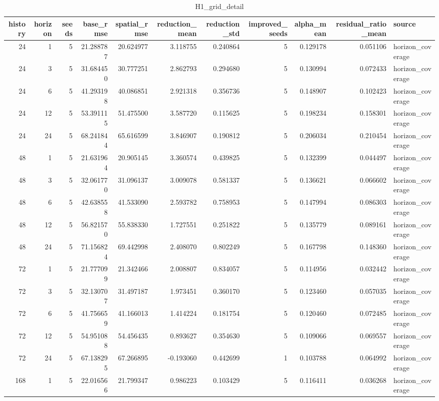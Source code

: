 \begin{table}
\caption{H1_grid_detail}
\label{tab:H1_grid_detail}
\begin{tabular}{rrrrrrrrrrl}
\toprule
history & horizon & seeds & base\_rmse & spatial\_rmse & reduction\_mean & reduction\_std & improved\_seeds & alpha\_mean & residual\_ratio\_mean & source \\
\midrule
24 & 1 & 5 & 21.288787 & 20.624977 & 3.118755 & 0.240864 & 5 & 0.129178 & 0.051106 & horizon\_coverage \\
24 & 3 & 5 & 31.684450 & 30.777251 & 2.862793 & 0.294680 & 5 & 0.130994 & 0.072433 & horizon\_coverage \\
24 & 6 & 5 & 41.293198 & 40.086851 & 2.921318 & 0.356736 & 5 & 0.148907 & 0.102423 & horizon\_coverage \\
24 & 12 & 5 & 53.391115 & 51.475500 & 3.587720 & 0.115625 & 5 & 0.198234 & 0.158301 & horizon\_coverage \\
24 & 24 & 5 & 68.241844 & 65.616599 & 3.846907 & 0.190812 & 5 & 0.206034 & 0.210454 & horizon\_coverage \\
48 & 1 & 5 & 21.631964 & 20.905145 & 3.360574 & 0.439825 & 5 & 0.132399 & 0.044497 & horizon\_coverage \\
48 & 3 & 5 & 32.061770 & 31.096137 & 3.009078 & 0.581337 & 5 & 0.136621 & 0.066602 & horizon\_coverage \\
48 & 6 & 5 & 42.638558 & 41.533090 & 2.593782 & 0.758953 & 5 & 0.147994 & 0.086303 & horizon\_coverage \\
48 & 12 & 5 & 56.821570 & 55.838330 & 1.727551 & 0.251822 & 5 & 0.135779 & 0.089161 & horizon\_coverage \\
48 & 24 & 5 & 71.156824 & 69.442998 & 2.408070 & 0.802249 & 5 & 0.167798 & 0.148360 & horizon\_coverage \\
72 & 1 & 5 & 21.777099 & 21.342466 & 2.008807 & 0.834057 & 5 & 0.114956 & 0.032442 & horizon\_coverage \\
72 & 3 & 5 & 32.130707 & 31.497187 & 1.973451 & 0.360170 & 5 & 0.123460 & 0.057035 & horizon\_coverage \\
72 & 6 & 5 & 41.756659 & 41.166013 & 1.414224 & 0.181754 & 5 & 0.120460 & 0.072485 & horizon\_coverage \\
72 & 12 & 5 & 54.951088 & 54.456435 & 0.893627 & 0.354630 & 5 & 0.109066 & 0.069557 & horizon\_coverage \\
72 & 24 & 5 & 67.138295 & 67.266895 & -0.193060 & 0.442699 & 1 & 0.103788 & 0.064992 & horizon\_coverage \\
168 & 1 & 5 & 22.016566 & 21.799347 & 0.986223 & 0.103429 & 5 & 0.116411 & 0.036268 & horizon\_coverage \\

\end{tabular}
\end{table}
